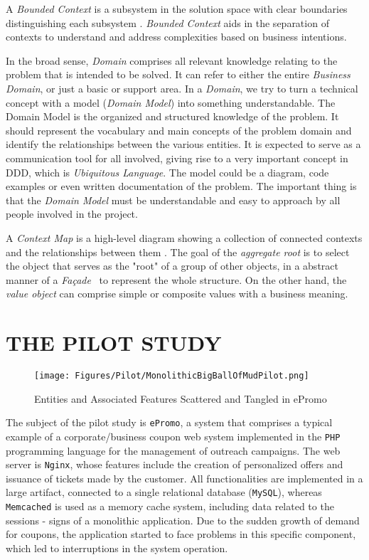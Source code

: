 \documentclass[a4paper,twoside]{article}
\begin{document}
A \textit{Bounded Context} is a subsystem in the solution space with clear boundaries distinguishing each subsystem \cite{evans2004domain}. \textit{Bounded Context} aids in the separation of contexts to understand and address complexities based on business intentions.

In the broad sense, \textit{Domain} comprises all relevant knowledge relating to the problem that is intended to be solved. It can refer to either the entire \textit{Business Domain}, or just a basic or support area. In a \textit{Domain}, we try to turn a technical concept with a model (\textit{Domain Model}) into something understandable. The Domain Model is the organized and structured knowledge of the problem. It should represent the vocabulary and main concepts of the problem domain and identify the relationships between the various entities. It is expected to serve as a communication tool for all involved, giving rise to a very important concept in DDD, which is \textit{Ubiquitous Language}. The model could be a diagram, code examples or even written documentation of the problem. The important thing is that the \textit{Domain Model} must be understandable and easy to approach by all people involved in the project.

A \textit{Context Map} is a high-level diagram showing a collection of connected contexts and the relationships between them \cite{evans2004domain}. The goal of the \textit{aggregate root} is to select the object that serves as the "root" of a group of other objects, in a abstract manner of a \textit{Fa\c{c}ade}~\cite{gamma1995design} to represent the whole structure. On the other hand, the \textit{value object} can comprise simple or composite values with a business meaning.

\section{\uppercase{The Pilot Study}}
\label{sec:thePilotStudy}

\begin{figure}
\centering
\texttt{[image: Figures/Pilot/MonolithicBigBallOfMudPilot.png]}
\caption{Entities and Associated Features Scattered and Tangled in ePromo \cite{henriqueITNG2019expReport}}
\label{fig:MonolithicBigBallOfMudPilot}
\end{figure}

\noindent The subject of the pilot study is \texttt{ePromo}, a system that comprises a typical example of a corporate/business coupon web system implemented in the \texttt{PHP} programming language for the management of outreach campaigns. The web server is \texttt{Nginx}, whose features include the creation of personalized offers and issuance of tickets made by the customer. All functionalities are implemented in a large artifact, connected to a single relational database (\texttt{MySQL}), whereas \texttt{Memcached} is used as a memory cache system, including data related to the sessions - signs of a monolithic application. Due to the sudden growth of demand for coupons, the application started to face problems in this specific component, which led to interruptions in the system operation.
\end{document}
